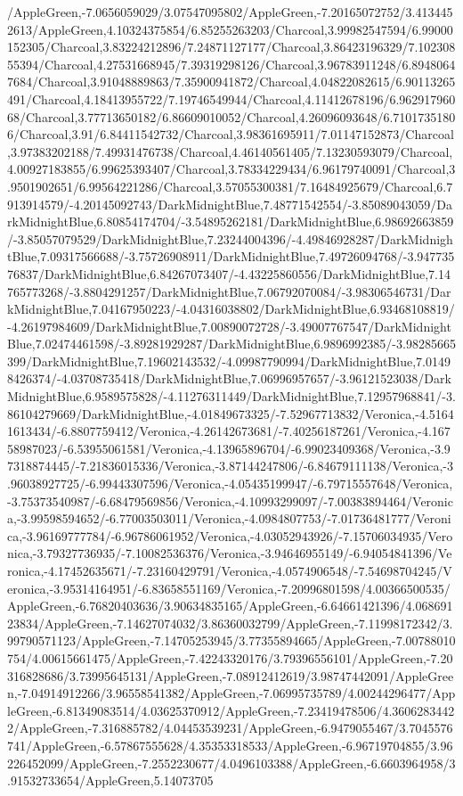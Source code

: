 {\begin{tikzternal}
/AppleGreen,-7.0656059029/3.07547095802/AppleGreen,-7.20165072752/3.4134452613/AppleGreen,4.10324375854/6.85255263203/Charcoal,3.99982547594/6.99000152305/Charcoal,3.83224212896/7.24871127177/Charcoal,3.86423196329/7.10230855394/Charcoal,4.27531668945/7.39319298126/Charcoal,3.96783911248/6.89480647684/Charcoal,3.91048889863/7.35900941872/Charcoal,4.04822082615/6.90113265491/Charcoal,4.18413955722/7.19746549944/Charcoal,4.11412678196/6.96291796068/Charcoal,3.77713650182/6.86609010052/Charcoal,4.26096093648/6.71017351806/Charcoal,3.91/6.84411542732/Charcoal,3.98361695911/7.01147152873/Charcoal,3.97383202188/7.49931476738/Charcoal,4.46140561405/7.13230593079/Charcoal,4.00927183855/6.99625393407/Charcoal,3.78334229434/6.96179740091/Charcoal,3.9501902651/6.99564221286/Charcoal,3.57055300381/7.16484925679/Charcoal,6.7913914579/-4.20145092743/DarkMidnightBlue,7.48771542554/-3.85089043059/DarkMidnightBlue,6.80854174704/-3.54895262181/DarkMidnightBlue,6.98692663859/-3.85057079529/DarkMidnightBlue,7.23244004396/-4.49846928287/DarkMidnightBlue,7.09317566688/-3.75726908911/DarkMidnightBlue,7.49726094768/-3.94773576837/DarkMidnightBlue,6.84267073407/-4.43225860556/DarkMidnightBlue,7.14765773268/-3.8804291257/DarkMidnightBlue,7.06792070084/-3.98306546731/DarkMidnightBlue,7.04167950223/-4.04316038802/DarkMidnightBlue,6.93468108819/-4.26197984609/DarkMidnightBlue,7.00890072728/-3.49007767547/DarkMidnightBlue,7.02474461598/-3.89281929287/DarkMidnightBlue,6.9896992385/-3.98285665399/DarkMidnightBlue,7.19602143532/-4.09987790994/DarkMidnightBlue,7.01498426374/-4.03708735418/DarkMidnightBlue,7.06996957657/-3.96121523038/DarkMidnightBlue,6.9589575828/-4.11276311449/DarkMidnightBlue,7.12957968841/-3.86104279669/DarkMidnightBlue,-4.01849673325/-7.52967713832/Veronica,-4.51641613434/-6.8807759412/Veronica,-4.26142673681/-7.40256187261/Veronica,-4.16758987023/-6.53955061581/Veronica,-4.13965896704/-6.99023409368/Veronica,-3.97318874445/-7.21836015336/Veronica,-3.87144247806/-6.84679111138/Veronica,-3.96038927725/-6.99443307596/Veronica,-4.05435199947/-6.79715557648/Veronica,-3.75373540987/-6.68479569856/Veronica,-4.10993299097/-7.00383894464/Veronica,-3.99598594652/-6.77003503011/Veronica,-4.0984807753/-7.01736481777/Veronica,-3.96169777784/-6.96786061952/Veronica,-4.03052943926/-7.15706034935/Veronica,-3.79327736935/-7.10082536376/Veronica,-3.94646955149/-6.94054841396/Veronica,-4.17452635671/-7.23160429791/Veronica,-4.0574906548/-7.54698704245/Veronica,-3.95314164951/-6.83658551169/Veronica,-7.20996801598/4.00366500535/AppleGreen,-6.76820403636/3.90634835165/AppleGreen,-6.64661421396/4.06869123834/AppleGreen,-7.14627074032/3.86360032799/AppleGreen,-7.11998172342/3.99790571123/AppleGreen,-7.14705253945/3.77355894665/AppleGreen,-7.00788010754/4.00615661475/AppleGreen,-7.42243320176/3.79396556101/AppleGreen,-7.20316828686/3.73995645131/AppleGreen,-7.08912412619/3.98747442091/AppleGreen,-7.04914912266/3.96558541382/AppleGreen,-7.06995735789/4.00244296477/AppleGreen,-6.81349083514/4.03625370912/AppleGreen,-7.23419478506/4.36062834422/AppleGreen,-7.316885782/4.04453539231/AppleGreen,-6.9479055467/3.7045576741/AppleGreen,-6.57867555628/4.35353318533/AppleGreen,-6.96719704855/3.96226452099/AppleGreen,-7.2552230677/4.0496103388/AppleGreen,-6.6603964958/3.91532733654/AppleGreen,5.14073705
\end{tikzternal}}
